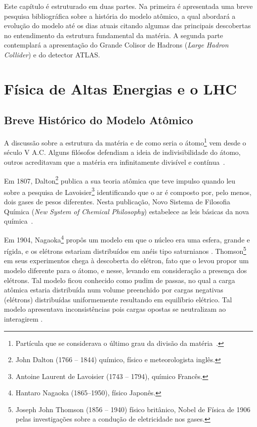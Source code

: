 
Este capítulo é estruturado em duas partes. Na primeira é apresentada uma breve pesquisa bibliográfica sobre a história do modelo atômico, a qual abordará a evolução do modelo até os dias atuais citando algumas das principais descobertas no entendimento da estrutura fundamental da matéria. A segunda parte contemplará a apresentação do Grande Colisor de Hadrons (\textit{Large Hadron Collider}) e do detector ATLAS.



\section{Física de Altas Energias e o LHC}

\subsection{Breve Histórico do Modelo Atômico}
A discussão sobre a estrutura da matéria e de como seria o átomo\footnote{Partícula que se considerava o último grau da divisão da matéria~\cite{priberam2016}.} vem desde o século V A.C. Alguns filósofos defendiam a ideia de indivisibilidade do átomo, outros acreditavam que a matéria era infinitamente divisível e contínua~\cite{book:rocha2002}.

Em 1807, Dalton\footnote{John Dalton (1766 -- 1844) químico, físico e meteorologista inglês.} publica a sua teoria atômica que teve impulso quando leu sobre a pesquisa de Lavoisier\footnote{Antoine Laurent de Lavoisier (1743 -- 1794), químico Francês.} identificando que o ar é composto por, pelo menos, dois gases de pesos diferentes. Nesta publicação, Novo Sistema de Filosofia Química (\textit{New System of Chemical Philosophy}) estabelece as leis básicas da nova química~\cite{book:pinheiro2011}.

Em 1904, Nagaoka\footnote{Hantaro Nagaoka (1865--1950), físico Japonês.} propôs um modelo em que o núcleo era uma esfera, grande e rígida, e os elétrons estariam distribuídos em anéis tipo saturnianos \cite{Inamura2016}. Thomson\footnote{Joseph John Thomson (1856 -- 1940) físico britânico, Nobel de Física de 1906 pelas investigações sobre a condução de eletricidade nos gases.} em seus experimentos chega à descoberta do elétron, fato que o levou propor um modelo diferente para o átomo, e nesse, levando em consideração a presença dos elétrons. Tal modelo ficou conhecido como pudim de passas, no qual a carga atômica estaria distribuída num volume preenchido por cargas negativas (elétrons) distribuídas uniformemente resultando em equilíbrio elétrico. Tal modelo apresentava inconsistências pois cargas opostas se neutralizam ao interagirem \cite{book:rocha2002, book:pinheiro2011}.

